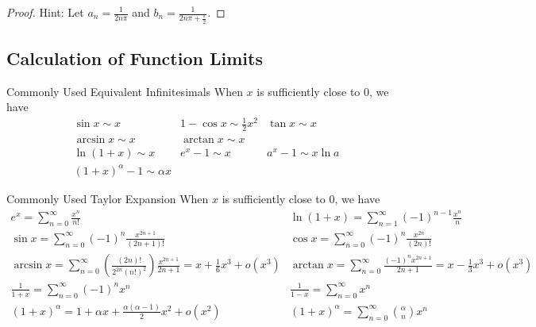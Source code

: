 \begin{proof}
  Hint: Let $a_n = \frac{1}{2n\pi}$ and $b_n = \frac{1}{2n\pi + \frac{\pi}{2}}$.
\end{proof}

\subsection{Calculation of Function Limits}

\begin{proposition}{Commonly Used Equivalent Infinitesimals}{}
  When $x$ is sufficiently close to $0$, we have
  \begin{equation}
    \begin{array}{lll}
      \sin x \sim x &1 - \cos x \sim \frac{1}{2}x^2 &\tan x \sim x\\
      \arcsin x \sim x & \arctan x \sim x&\\
      \ln(1 + x)\sim x & e^x - 1 \sim x& a^x - 1 \sim x \ln a\\
      (1 + x)^{\alpha} - 1 \sim \alpha x&&
    \end{array}
  \end{equation}
\end{proposition}

\begin{proposition}{Commonly Used Taylor Expansion}{}
  When $x$ is sufficiently close to $0$, we have
  \begin{equation}
    \begin{array}{ll}
    e^x = \sum\limits_{n = 0 }^{\infty}\frac{x^n}{n!}& \ln(1 + x) = \sum\limits_{n = 1}^{\infty}(-1)^{n-1}\frac{x^n}{n} \\
    \sin x = \sum\limits_{n = 0}^{\infty}(-1)^n \frac{x^{2n+1}}{(2n+1)!}& \cos x = \sum\limits_{n = 0}^{\infty}(-1)^n \frac{x^{2n}}{(2n)!} \\
    \arcsin x =\sum\limits_{n = 0}^{\infty}\left( \frac{(2n)!}{2^{2n}(n!)^2} \right)\frac{x^{2n+1}}{2n+1} =  x + \frac{1}{6}x^3 + o(x^3) &\arctan x = \sum\limits_{n = 0}^{\infty} \frac{(-1)^nx^{2n+1}}{2n+1} = x - \frac{1}{3}x^3 + o(x^3) \\
    \frac{1}{1+x} = \sum\limits_{n = 0}^{\infty}(-1)^n x^n&\frac{1}{1 - x} = \sum\limits_{n = 0}^{\infty}x^n \\
    (1+x)^{\alpha} = 1 + \alpha x + \frac{\alpha(\alpha - 1)}{2}x^2 + o(x^2)&(1 + x)^{\alpha} = \sum\limits_{n = 0}^{\infty}{\alpha \choose n} x^n
  \end{array}
  \end{equation}
\end{proposition}


